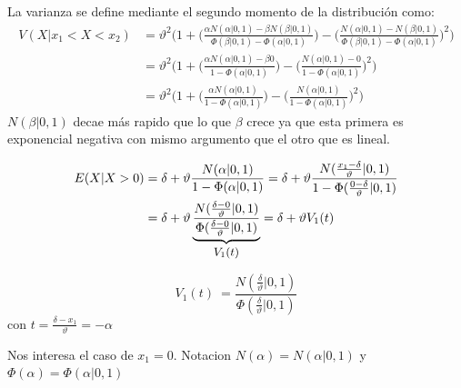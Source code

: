 \documentclass[11pt,twoside,spanish]{report} %
\begin{document}
La varianza se define mediante el segundo momento de la distribuci\'on como:
\begin{equation}\label{eq:variance_aprox_double}
	\begin{split}
		V(X| x_1 < X < x_2) &= \vartheta^2 \Bigg( 1 + \bigg(\frac{\alpha N(\alpha|0,1) - \beta N(\beta|0,1) }{\Phi(\beta|0,1) - \Phi(\alpha|0,1) }\bigg) - \bigg(\frac{N(\alpha|0,1) - N(\beta|0,1) }{\Phi(\beta|0,1) - \Phi(\alpha|0,1) }\bigg)^2 \Bigg)\\
		&=\vartheta^2 \Bigg( 1 + \bigg(\frac{\alpha N(\alpha|0,1) - \beta 0 }{1 - \Phi(\alpha|0,1) }\bigg) - \bigg(\frac{N(\alpha|0,1) - 0 }{1 - \Phi(\alpha|0,1) }\bigg)^2 \Bigg)\\
		&=\vartheta^2 \Bigg( 1 + \bigg(\frac{\alpha N(\alpha|0,1)}{1 - \Phi(\alpha|0,1) }\bigg) - \bigg(\frac{N(\alpha|0,1) }{1 - \Phi(\alpha|0,1) }\bigg)^2 \Bigg)
	\end{split}
\end{equation}
$N(\beta|0,1)$ decae m\'as rapido que lo que $\beta$ crece ya que esta primera es exponencial negativa con mismo argumento que el otro que es lineal.



\begin{equation}\label{eq:mean_aprox_}
	\begin{split}
		E(X|  X > 0)  &= \delta + \vartheta \frac{N(\alpha|0,1)}{1 - \Phi(\alpha|0,1) } = \delta + \vartheta \frac{N(\frac{x_1-\delta}{\vartheta}|0,1)}{1 - \Phi(\frac{0-\delta}{\vartheta}|0,1) }\\
		& = \delta + \vartheta \underbrace{\frac{N(\frac{\delta-0}{\vartheta}|0,1)}{\Phi(\frac{\delta-0}{\vartheta}|0,1) }}_{\text{\small $V_1(t)$} } = \delta + \vartheta V_1(t)
	\end{split}
\end{equation}

\begin{equation}
	V_1(t)\ = \frac{N(\frac{\delta}{\vartheta}|0,1)}{\Phi(\frac{\delta}{\vartheta}|0,1) }
\end{equation}
con $t = \frac{\delta -x_1}{\vartheta} = -\alpha  $

Nos interesa el caso de $x_1=0$. Notacion $N(\alpha)=N(\alpha|0,1)$ y $\Phi(\alpha) = \Phi(\alpha|0,1)$
\end{document}
